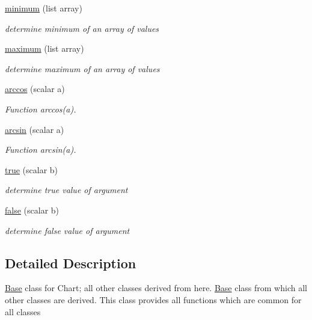 \begin{DoxyCompactItemize}
\hyperlink{classChart_1_1Base_ae65cef86e6b2f279b9446b01a9bea088}{minimum} (list array)
\begin{DoxyCompactList}\small\item\em determine minimum of an array of values \item\end{DoxyCompactList}\item 
\hyperlink{classChart_1_1Base_a3dd0d7d961b05b92020c476958b8e0a0}{maximum} (list array)
\begin{DoxyCompactList}\small\item\em determine maximum of an array of values \item\end{DoxyCompactList}\item 
\hyperlink{classChart_1_1Base_a97d3b67d31850ded3a7406a18c464ec9}{arccos} (scalar a)
\begin{DoxyCompactList}\small\item\em Function arccos(a). \item\end{DoxyCompactList}\item 
\hyperlink{classChart_1_1Base_a7da994b0d4ecf66262b4119745e38123}{arcsin} (scalar a)
\begin{DoxyCompactList}\small\item\em Function arcsin(a). \item\end{DoxyCompactList}\item 
\hyperlink{classChart_1_1Base_a9687d15b6d69b6a950f2b545940e62cd}{true} (scalar b)
\begin{DoxyCompactList}\small\item\em determine true value of argument \item\end{DoxyCompactList}\item 
\hyperlink{classChart_1_1Base_a72935251f89ad5d823649db7e07a3103}{false} (scalar b)
\begin{DoxyCompactList}\small\item\em determine false value of argument \item\end{DoxyCompactList}\end{DoxyCompactItemize}


\subsection{Detailed Description}
\hyperlink{classChart_1_1Base}{Base} class for Chart; all other classes derived from here. \hyperlink{classChart_1_1Base}{Base} class from which all other classes are derived. This class provides all functions which are common for all classes 

